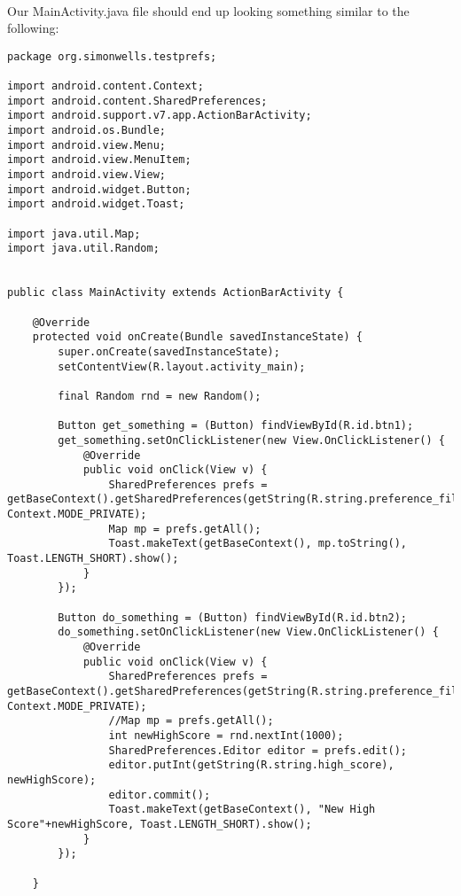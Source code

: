 \paragraph{} Our MainActivity.java file should end up looking something similar to the following:

\begin{lstlisting}
package org.simonwells.testprefs;

import android.content.Context;
import android.content.SharedPreferences;
import android.support.v7.app.ActionBarActivity;
import android.os.Bundle;
import android.view.Menu;
import android.view.MenuItem;
import android.view.View;
import android.widget.Button;
import android.widget.Toast;

import java.util.Map;
import java.util.Random;


public class MainActivity extends ActionBarActivity {

    @Override
    protected void onCreate(Bundle savedInstanceState) {
        super.onCreate(savedInstanceState);
        setContentView(R.layout.activity_main);

        final Random rnd = new Random();

        Button get_something = (Button) findViewById(R.id.btn1);
        get_something.setOnClickListener(new View.OnClickListener() {
            @Override
            public void onClick(View v) {
                SharedPreferences prefs = getBaseContext().getSharedPreferences(getString(R.string.preference_file_name), Context.MODE_PRIVATE);
                Map mp = prefs.getAll();
                Toast.makeText(getBaseContext(), mp.toString(), Toast.LENGTH_SHORT).show();
            }
        });

        Button do_something = (Button) findViewById(R.id.btn2);
        do_something.setOnClickListener(new View.OnClickListener() {
            @Override
            public void onClick(View v) {
                SharedPreferences prefs = getBaseContext().getSharedPreferences(getString(R.string.preference_file_name), Context.MODE_PRIVATE);
                //Map mp = prefs.getAll();
                int newHighScore = rnd.nextInt(1000);
                SharedPreferences.Editor editor = prefs.edit();
                editor.putInt(getString(R.string.high_score), newHighScore);
                editor.commit();
                Toast.makeText(getBaseContext(), "New High Score"+newHighScore, Toast.LENGTH_SHORT).show();
            }
        });

    }



\end{lstlisting}
